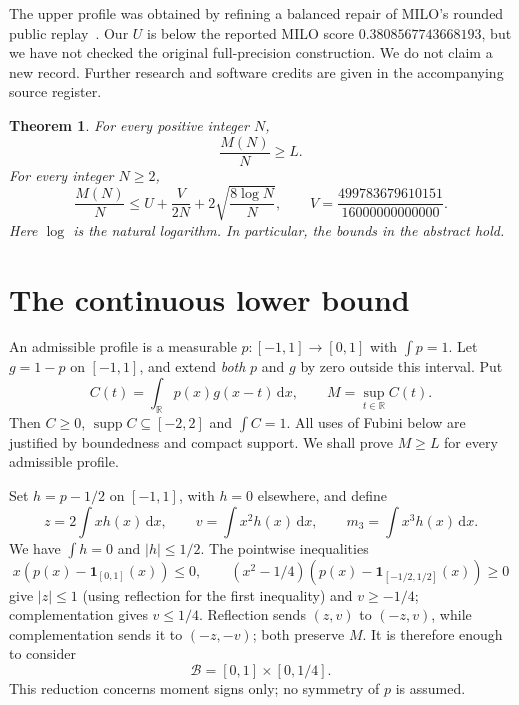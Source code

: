 \documentclass[10pt]{article}
\newtheorem{theorem}{Theorem}
\newcommand{\R}{\mathbb R}
\newcommand{\ind}{\mathbf 1}
\newcommand{\dd}{\,\mathrm d}
\newcommand{\Bcal}{\mathcal B}
\begin{document}
The upper profile was obtained by refining a balanced repair of MILO's rounded public replay~\cite{MILO}. Our $U$ is below the reported MILO score $0.3808567743668193$, but we have not checked the original full-precision construction. We do not claim a new record. Further research and software credits are given in the accompanying source register.

\begin{theorem}\label{thm:main}
For every positive integer $N$,
\begin{equation}\label{eq:finite-lower}
\frac{M(N)}N\geq L.
\end{equation}
For every integer $N\geq2$,
\begin{equation}\label{eq:finite-upper}
\frac{M(N)}N\leq U+\frac{V}{2N}
             +2\sqrt{\frac{8\log N}{N}},
\qquad V=\frac{499783679610151}{16000000000000}.
\end{equation}
Here $\log$ is the natural logarithm. In particular, the bounds in the abstract hold.
\end{theorem}

\section{The continuous lower bound}\label{sec:lower}
An admissible profile is a measurable $p:[-1,1]\to[0,1]$ with $\int p=1$.
Let $g=1-p$ on $[-1,1]$, and extend \emph{both} $p$ and $g$ by zero outside this interval. Put
\[
C(t)=\int_{\R}p(x)g(x-t)\dd x,\qquad M=\sup_{t\in\R}C(t).
\]
Then $C\geq0$, $\operatorname{supp}C\subseteq[-2,2]$ and $\int C=1$.
All uses of Fubini below are justified by boundedness and compact support.
We shall prove $M\geq L$ for every admissible profile.

Set $h=p-1/2$ on $[-1,1]$, with $h=0$ elsewhere, and define
\[
z=2\int xh(x)\dd x,\qquad v=\int x^2h(x)\dd x,
\qquad m_3=\int x^3h(x)\dd x.
\]
We have $\int h=0$ and $|h|\leq1/2$. The pointwise inequalities
\[
x(p(x)-\ind_{[0,1]}(x))\leq0,\qquad
(x^2-1/4)(p(x)-\ind_{[-1/2,1/2]}(x))\geq0
\]
give $|z|\leq1$ (using reflection for the first inequality) and $v\geq-1/4$; complementation gives $v\leq1/4$.
Reflection sends $(z,v)$ to $(-z,v)$, while complementation sends it to $(-z,-v)$; both preserve $M$.
It is therefore enough to consider
\begin{equation}\label{eq:moment-box}
\Bcal=[0,1]\times[0,1/4].
\end{equation}
This reduction concerns moment signs only; no symmetry of $p$ is assumed.
\end{document}
